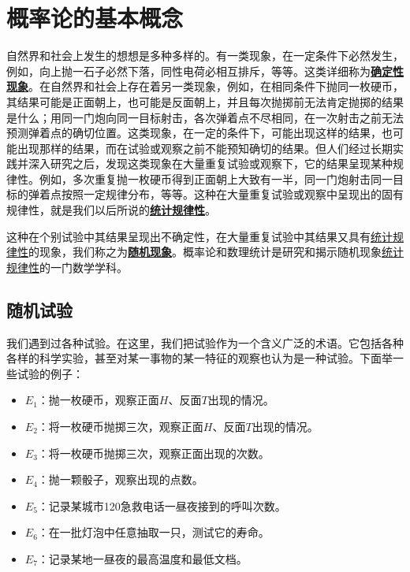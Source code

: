 \documentclass{ctexbook}
\newcommand{\newconcept}[1]{\textbf{\uline{#1}}}
\begin{document}
	
\chapter{概率论的基本概念}
	
	自然界和社会上发生的想想是多种多样的。有一类现象，在一定条件下必然发生，例如，向上抛一石子必然下落，同性电荷必相互排斥，等等。这类详细称为\newconcept{确定性现象}\label{concept:Certanty}。在自然界和社会上存在着另一类现象，例如，在相同条件下抛同一枚硬币，其结果可能是正面朝上，也可能是反面朝上，并且每次抛掷前无法肯定抛掷的结果是什么；用同一门炮向同一目标射击，各次弹着点不尽相同，在一次射击之前无法预测弹着点的确切位置。这类现象，在一定的条件下，可能出现这样的结果，也可能出现那样的结果，而在试验或观察之前不能预知确切的结果。但人们经过长期实践并深入研究之后，发现这类现象在大量重复试验或观察下，它的结果呈现某种规律性。例如，多次重复抛一枚硬币得到正面朝上大致有一半，同一门炮射击同一目标的弹着点按照一定规律分布，等等。这种在大量重复试验或观察中呈现出的固有规律性，就是我们以后所说的\newconcept{统计规律性}\label{concept:StatisticalRegularity}。
	
	这种在个别试验中其结果呈现出不确定性，在大量重复试验中其结果又具有\hyperref[concept:StatisticalRegularity]{统计规律性}的现象，我们称之为\newconcept{随机现象}。概率论和数理统计是研究和揭示随机现象\hyperref[concept:StatisticalRegularity]{统计规律性}的一门数学学科。
	
\section{随机试验}
	
	我们遇到过各种试验。在这里，我们把试验作为一个含义广泛的术语。它包括各种各样的科学实验，甚至对某一事物的某一特征的观察也认为是一种试验。下面举一些试验的例子：\label{example:RandomExperiment}
	\begin{itemize}
		\item $ E_1 $：抛一枚硬币，观察正面$ H $、反面$ T $出现的情况。
		\item $ E_2 $：将一枚硬币抛掷三次，观察正面$ H $、反面$ T $出现的情况。
		\item $ E_3 $：将一枚硬币抛掷三次，观察正面出现的次数。
		\item $ E_4 $：抛一颗骰子，观察出现的点数。
		\item $ E_5 $：记录某城市120急救电话一昼夜接到的呼叫次数。
		\item $ E_6 $：在一批灯泡中任意抽取一只，测试它的寿命。
		\item $ E_7 $：记录某地一昼夜的最高温度和最低文档。
	\end{itemize}
	
\end{document}
